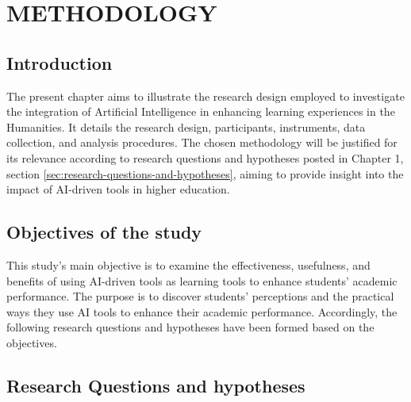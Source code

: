 \chapter{METHODOLOGY}
\section{Introduction}
The present chapter aims to illustrate the research design employed 
to investigate the integration of Artificial Intelligence in enhancing 
learning experiences in the Humanities. It details the research design,
participants, instruments, data collection, and analysis procedures.
The chosen methodology will be justified for its relevance according to
research questions and hypotheses posted in Chapter 1, section \ref{sec:research-questions-and-hypotheses},
aiming to provide insight into the impact of AI-driven tools in higher education.

\section{Objectives of the study}
This study's main objective is to examine the effectiveness, usefulness, 
and benefits of using AI-driven tools as learning tools to enhance students’
academic performance. The purpose is to discover students’ perceptions and
the practical ways they use AI tools to enhance their academic performance.
Accordingly, the following research questions and hypotheses have been 
formed based on the objectives.
\section{Research Questions and hypotheses}
